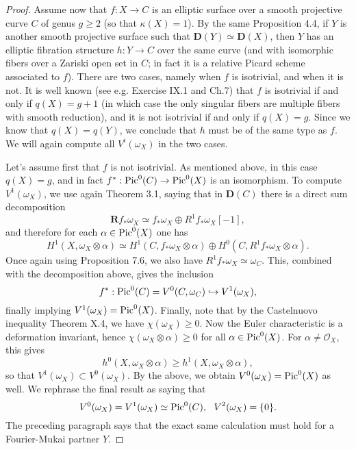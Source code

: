 \documentclass{amsart}
\theoremstyle{plain}
\theoremstyle{definition}
\numberwithin{equation}{section}
\begin{document}
\begin{proof}
Assume now that $f: X \rightarrow C$ is an elliptic surface over a smooth projective curve $C$ of 
genus $g \ge 2$ (so that $\kappa(X) = 1$).  By the same \cite{bm} Proposition 4.4, if $Y$ is another smooth projective surface such that ${\mathbf{D}}(Y) \simeq {\mathbf{D}}(X)$, then $Y$ has an elliptic fibration structure $h: Y \rightarrow C$ over the same curve (and with isomorphic fibers over a Zariski open set in $C$; in fact it is a relative Picard 
scheme associated to $f$). There are two cases, namely when $f$ is isotrivial, and  when it is not. It is well known (see e.g. \cite{beauville1} Exercise IX.1 and \cite{friedman} Ch.7) that $f$ is isotrivial if and only if $q (X) = g + 1$ (in which case the only singular fibers are multiple fibers with smooth reduction), and it is not isotrivial if and only if $q (X) = g$. Since we know that $q (X) = q (Y)$, we conclude that $h$ must be of the same type as $f$. We will again compute all $V^i (\omega_X)$ in the two cases.

Let's assume first that $f$ is not isotrivial.  As mentioned above, in this case $q (X) = g$, and in fact 
$f^*: {\rm Pic}^0 (C) \rightarrow {\rm Pic}^0 (X)$ is an isomorphism. To compute $V^1 (\omega_X)$, we use 
again \cite{kollar2} Theorem 3.1, saying that in ${\mathbf{D}}(C)$ there is a direct sum decomposition
$${\mathbf{R}} f_* \omega_X \simeq f_* \omega_X \oplus R^1 f_* \omega_X [-1],$$
and therefore for each $\alpha \in {\rm Pic}^0 (X)$ one has
$$H^1 (X, \omega_X \otimes \alpha) \simeq H^1 (C, f_* \omega_X \otimes \alpha) \oplus
H^0 (C, R^1 f_* \omega_X \otimes \alpha).$$
Once again using \cite{kollar1} Proposition 7.6, we also have $R^1 f_* \omega_X \simeq \omega_C$. This,  combined with the decomposition above, gives the inclusion
$$f^*: {\rm Pic}^0 (C) = V^0 (C, \omega_C)  \hookrightarrow V^1 (\omega_X),$$
finally implying $V^1 (\omega_X) = {\rm Pic}^0 (X)$.
Finally, note that by the Castelnuovo inequality \cite{beauville1} Theorem X.4, we have $\chi (\omega_X) \ge 0$. Now the Euler characteristic is a 
deformation invariant, hence $\chi (\omega_X \otimes \alpha) \ge 0$ for all $\alpha \in {\rm Pic}^0 (X)$.
For $\alpha \neq {{\mathcal O}}_X$, this gives 
$$h^0 (X, \omega_X \otimes \alpha) \ge h^1 (X, \omega_X \otimes \alpha),$$ 
so that $V^1 (\omega_X) \subset V^0 (\omega_X)$. By the above, we obtain 
$V^0 (\omega_X) = {\rm Pic}^0 (X)$ as well. We rephrase the final result as saying that
$$V^0 (\omega_X) = V^1 (\omega_X) \simeq {\rm Pic}^0 (C), \,\,\,\, 
V^2 (\omega_X) = \{0\}.$$
The preceding paragraph says that the exact same calculation must hold for a Fourier-Mukai partner $Y$. 


\end{proof}
\end{document}
